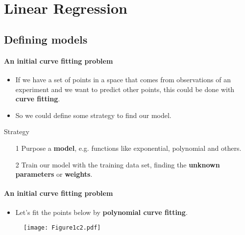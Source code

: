 \section{Linear Regression}\label{sec:linear-regression}
\framecard{\insertsection}
\subsection{Defining models}

\begin{frame}{\insertsubsection}
	\framesubtitle{An initial curve fitting problem}

\begin{itemize}
	\item If we have a set of points in a space that comes from observations of an experiment and we want to predict other points, this could be done with \textbf{\textcolor{UniOrange}{curve fitting}}.
	\item So we could define some strategy to find our model.
\end{itemize}

\begin{block}{Strategy}
	\begin{itemize}
		\item[1] Purpose a \textcolor{UniBlue}{\textbf{model}}, e.g. functions like exponential, polynomial and others.
		\item[2] Train our model with the training data set, finding the \textcolor{UniBlue}{\textbf{unknown parameters}} or \textcolor{UniBlue}{\textbf{weights}}.
	\end{itemize}
\end{block}
\end{frame}


\begin{frame}{\insertsubsection}
	\framesubtitle{An initial curve fitting problem}
	\begin{itemize}
		\item Let's fit the points below by \textcolor{UniOrange}{\textbf{polynomial curve fitting}}.
	\end{itemize}

	\begin{figure}
	\label{fig:plot-fitting-example}
		\texttt{[image: Figure1c2.pdf]}
	\end{figure}
\end{frame}


